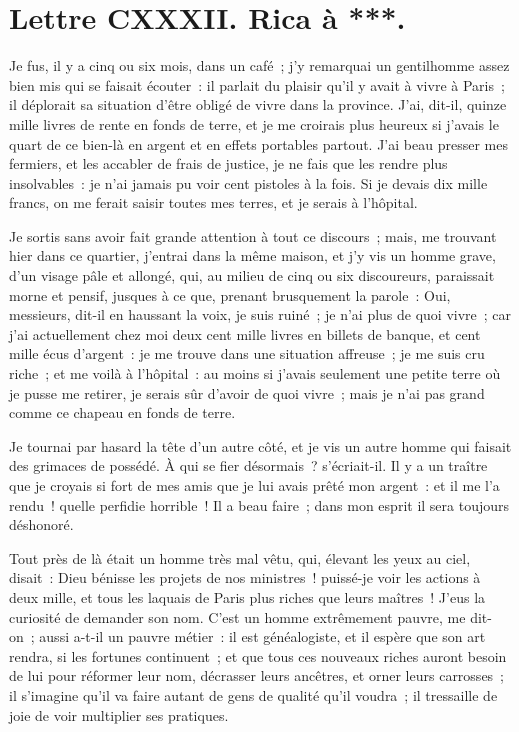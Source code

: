 \documentclass[french,twoside]{book} %
\newcommand{\dateline}[1]{\medskip{\RaggedLeft{#1}\par}\bigskip}
\begin{document}
\dateline{De Venise, le 20 de la lune de Rhégeb, 1719.}
\section[{Lettre CXXXII. Rica à ***.}]{Lettre CXXXII. Rica à ***.}\renewcommand{\leftmark}{Lettre CXXXII. Rica à ***.}

\noindent Je fus, il y a cinq ou six mois, dans un café ; j’y remarquai un gentilhomme assez bien mis qui se faisait écouter : il parlait du plaisir qu’il y avait à vivre à Paris ; il déplorait sa situation d’être obligé de vivre dans la province. J’ai, dit-il, quinze mille livres de rente en fonds de terre, et je me croirais plus heureux si j’avais le quart de ce bien-là en argent et en effets portables partout. J’ai beau presser mes fermiers, et les accabler de frais de justice, je ne fais que les rendre plus insolvables : je n’ai jamais pu voir cent pistoles à la fois. Si je devais dix mille francs, on me ferait saisir toutes mes terres, et je serais à l’hôpital.\par
Je sortis sans avoir fait grande attention à tout ce discours ; mais, me trouvant hier dans ce quartier, j’entrai dans la même maison, et j’y vis un homme grave, d’un visage pâle et allongé, qui, au milieu de cinq ou six discoureurs, paraissait morne et pensif, jusques à ce que, prenant brusquement la parole : Oui, messieurs, dit-il en haussant la voix, je suis ruiné ; je n’ai plus de quoi vivre ; car j’ai actuellement chez moi deux cent mille livres en billets de banque, et cent mille écus d’argent : je me trouve dans une situation affreuse ; je me suis cru riche ; et me voilà à l’hôpital : au moins si j’avais seulement une petite terre où je pusse me retirer, je serais sûr d’avoir de quoi vivre ; mais je n’ai pas grand comme ce chapeau en fonds de terre.\par
Je tournai par hasard la tête d’un autre côté, et je vis un autre homme qui faisait des grimaces de possédé. À qui se fier désormais ? s’écriait-il. Il y a un traître que je croyais si fort de mes amis que je lui avais prêté mon argent : et il me l’a rendu ! quelle perfidie horrible ! Il a beau faire ; dans mon esprit il sera toujours déshonoré.\par
Tout près de là était un homme très mal vêtu, qui, élevant les yeux au ciel, disait : Dieu bénisse les projets de nos ministres ! puissé-je voir les actions à deux mille, et tous les laquais de Paris plus riches que leurs maîtres ! J’eus la curiosité de demander son nom. C’est un homme extrêmement pauvre, me dit-on ; aussi a-t-il un pauvre métier : il est généalogiste, et il espère que son art rendra, si les fortunes continuent ; et que tous ces nouveaux riches auront besoin de lui pour réformer leur nom, décrasser leurs ancêtres, et orner leurs carrosses ; il s’imagine qu’il va faire autant de gens de qualité qu’il voudra ; il tressaille de joie de voir multiplier ses pratiques.\par
\end{document}
